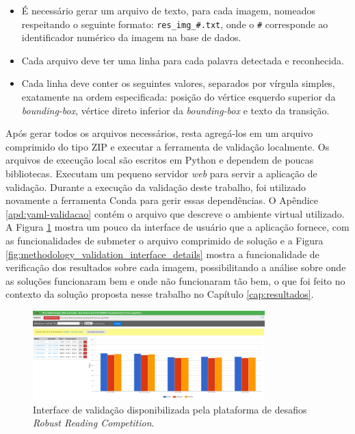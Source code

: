\begin{itemize}
    \item É necessário gerar um arquivo de texto, para cada imagem, nomeados respeitando o seguinte formato: \texttt{res\_img\_\#.txt}, onde o \texttt{\#} 
    corresponde ao identificador numérico da imagem na base de dados.

    \item Cada arquivo deve ter uma linha para cada palavra detectada e reconhecida.

    \item Cada linha deve conter os seguintes valores, separados por vírgula simples, exatamente na ordem especificada: posição do vértice esquerdo 
    superior da \textit{bounding-box}, vértice direto inferior da \textit{bounding-box} e texto da transição.
\end{itemize}

Após gerar todos os arquivos necessários, resta agregá-los em um arquivo comprimido do tipo ZIP e executar a ferramenta de validação localmente. 
Os arquivos de execução local são escritos em Python e dependem de poucas bibliotecas. Executam um pequeno servidor \textit{web} para servir a aplicação 
de validação. Durante a execução da validação deste trabalho, foi utilizado novamente a ferramenta Conda para gerir essas dependências. O Apêndice 
\ref{apd:yaml-validacao} contém o arquivo que descreve o ambiente virtual utilizado. A Figura \ref{fig:methodology_validation_interface} mostra um 
pouco da interface de usuário que a aplicação fornece, com as funcionalidades de submeter o arquivo comprimido de solução e a Figura 
\ref{fig:methodology_validation_interface_details} mostra a funcionalidade de verificação dos resultados sobre cada imagem, possibilitando a 
análise sobre onde as soluções funcionaram bem e onde não funcionaram tão bem, o que foi feito no contexto da solução proposta nesse trabalho 
no Capítulo \ref{cap:resultados}.

\begin{figure}
    \centering
    \includegraphics[width=0.8\textwidth]{figs/metodologia-interface-validacao.png}
    \caption{Interface de validação disponibilizada pela plataforma de desafios \textit{Robust Reading Competition}.}
    \label{fig:methodology_validation_interface}
\end{figure}

